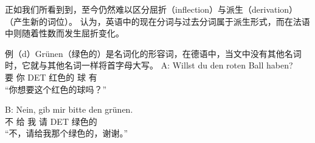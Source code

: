 
正如我们所看到到，至今仍然难以区分屈折（inflection）与派生（derivation） （产生新的词位）。\citet*[--264]{SWB2003a} 认为，英语中的现在分词与过去分词属于派生形式，而在法语中则随着性数而发生屈折变化。

例（d）Grünen（绿色的）是名词化的形容词，在德语中，当文中没有其他名词时，它就与其他名词一样将首字母大写。
\ea
\gll A: Willst du den roten Ball haben?\\
	 {} 要 你 DET 红色的 球 有\\
\glt {} “你想要这个红色的球吗？”

\gll B: Nein, gib mir bitte den grünen.\\
	{} 不 给 我 请 DET 绿色的\\
\glt {} “不，请给我那个绿色的，谢谢。”
\z

